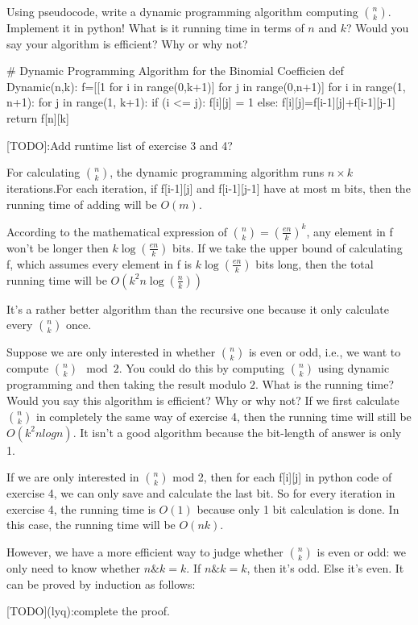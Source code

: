 \documentclass[11pt,a4paper,oneside]{article}
\begin{document}
\begin{problem}{4}
    Using pseudocode, write a dynamic programming algorithm
    computing ${n \choose k}$. Implement it in python! What is it running time
    in terms of $n$ and $k$?
    Would you say your algorithm is efficient? Why or why not?
    \solution
    \begin{python}
    	# Dynamic Programming Algorithm for the Binomial Coefficien
    	def Dynamic(n,k):
    	f=[[1 for i in range(0,k+1)] for j in range(0,n+1)]
    	for i in range(1, n+1):
    	for j in range(1, k+1):
    	if (i <= j):
    	f[i][j] = 1
    	else:
    	f[i][j]=f[i-1][j]+f[i-1][j-1]
    	return f[n][k]
    \end{python}
    
    [TODO]:Add runtime list of exercise 3 and 4?
    
    For calculating ${n \choose k}$, the dynamic programming algorithm runs $n \times k$ iterations.For each iteration, if f[i-1][j] and f[i-1][j-1] have at most m bits, then the running time of adding will be $O(m)$.
    
    According to the mathematical expression of ${n \choose k}=(\frac{en}{k})^k$, any element in f won't be longer then $k\log(\frac{en}{k})$ bits. If we take the upper bound of calculating f, which assumes every element in f is $k\log(\frac{en}{k})$ bits long, then the total running time will be $O(k^2n\log(\frac{n}{k}))$
    
    It's a rather better algorithm than the recursive one because it only calculate every ${n \choose k}$ once.

\end{problem}

\begin{problem}{5}
    \statement
    Suppose we are only interested in whether ${n \choose k}$ is even or odd,
  i.e., we want to compute ${n \choose k}  \mod 2$. You could do this by computing 
  ${n \choose k}$ using dynamic programming and then taking
  the result modulo $2$. What is the running time? Would you say this algorithm
  is efficient? Why or why not?
  \solution
If we first calculate ${n \choose k}$ in completely the same way of exercise 4, then the running time will still be $O(k^2nlogn)$. It isn't a good algorithm because the bit-length of answer is only 1.
 
If we are only interested in ${n \choose k}$ mod 2, then for each f[i][j] in python code of exercise 4, we can only save and calculate the last bit. So for every iteration in exercise 4, the running time is $O(1)$ because only 1 bit calculation is done. In this case, the running time will be $O(nk)$.

However, we have a more efficient way to judge whether ${n \choose k}$ is even or odd: we only need to know whether $n \& k = k$. If $n \& k = k$, then it's odd. Else it's even. It can be proved by induction as follows:

[TODO](lyq):complete the proof.
\end{problem}
\end{document}
